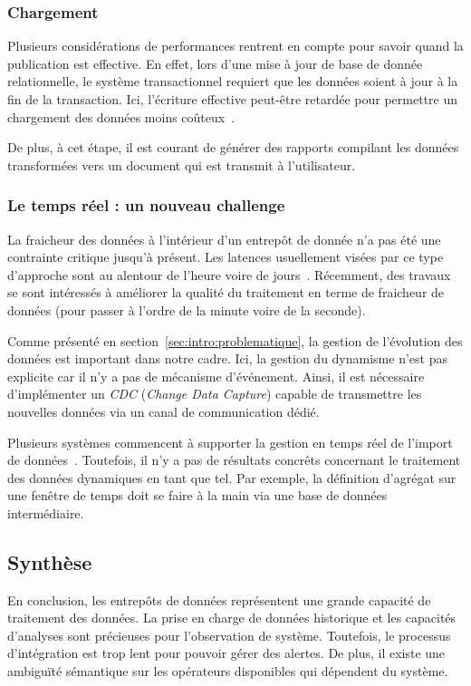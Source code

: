\subsubsection{Chargement}
Plusieurs considérations de performances rentrent en compte pour savoir quand la publication est effective. En effet, lors d'une mise à jour de base de donnée relationnelle, le système transactionnel requiert que les données soient à jour à la fin de la transaction. Ici, l'écriture effective peut-être retardée pour permettre un chargement des données moins coûteux~\cite{Petit:historical}.

De plus, à cet étape, il est courant de générer des rapports compilant les données transformées vers un document qui est transmit à l'utilisateur.

\subsubsection{Le temps réel : un nouveau challenge}
La fraicheur des données à l'intérieur d'un entrepôt de donnée n'a pas été une contrainte critique jusqu'à présent. Les latences usuellement visées par ce type d'approche sont au alentour de l'heure voire de jours~\cite{Oracle:realtimedw}. Récemment, des travaux se sont intéressés à améliorer la qualité du traitement en terme de fraicheur de données (pour passer à l'ordre de la minute voire de la seconde).

Comme présenté en section~\ref{sec:intro:problematique}, la gestion de l'évolution des données est important dans notre cadre. Ici, la gestion du dynamisme n'est pas explicite car il n'y a pas de mécanisme d'événement. Ainsi, il est nécessaire d'implémenter un \textit{CDC} (\textit{Change Data Capture}) capable de transmettre les nouvelles données via un canal de communication dédié.

Plusieurs systèmes commencent à supporter la gestion en temps réel de l'import de données~\cite{Thomsen:rite, Oracle:ODI}. Toutefois, il n'y a pas de résultats concrêts concernant le traitement des données dynamiques en tant que tel. Par exemple, la définition d'agrégat sur une fenêtre de temps doit se faire à la main via une base de données intermédiaire.

\subsection{Synthèse}
En conclusion, les entrepôts de données représentent une grande capacité de traitement des données. La prise en charge de données historique et les capacités d'analyses sont précieuses pour l'observation de système. Toutefois, le processus d'intégration est trop lent pour pouvoir gérer des alertes. De plus, il existe une ambiguïté sémantique sur les opérateurs disponibles qui dépendent du système.

